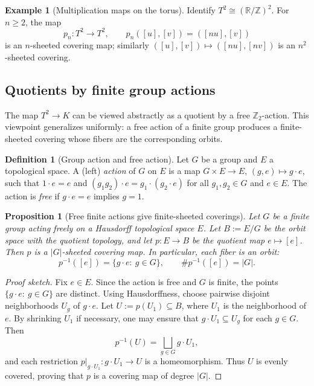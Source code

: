 \documentclass[11pt,a4paper]{article}
\newtheorem{proposition}[theorem]{Proposition}
\theoremstyle{definition}
\newtheorem{definition}[theorem]{Definition}
\newtheorem{example}[theorem]{Example}
\theoremstyle{remark}
\begin{document}
\begin{example}[Multiplication maps on the torus]
\label{ex:nfold-torus}
Identify \(T^2\cong (\mathbb{R}/\mathbb{Z})^2\). For \(n\ge 2\), the map
\[
p_n:T^2\to T^2,\qquad p_n([u],[v])=([nu],[v])
\]
is an \(n\)-sheeted covering map; similarly \(([u],[v])\mapsto([nu],[nv])\) is an \(n^2\)-sheeted covering.
\end{example}

\subsection{Quotients by finite group actions}
\label{sec:appendix-finite-group-quotients}

The map \(T^2\to K\) can be viewed abstractly as a quotient by a free \(\mathbb{Z}_2\)-action. This viewpoint generalizes uniformly: a free action of a finite group produces a finite-sheeted covering whose fibers are the corresponding orbits.

\begin{definition}[Group action and free action]
\label{def:free-action}
Let \(G\) be a group and \(E\) a topological space. A (left) \emph{action} of \(G\) on \(E\) is a map \(G\times E\to E\), \((g,e)\mapsto g\cdot e\), such that \(1\cdot e=e\) and \((g_1g_2)\cdot e=g_1\cdot(g_2\cdot e)\) for all \(g_1,g_2\in G\) and \(e\in E\). The action is \emph{free} if \(g\cdot e=e\) implies \(g=1\).
\end{definition}

\begin{proposition}[Free finite actions give finite-sheeted coverings]
\label{prop:finite-free-quotient-cover}
Let \(G\) be a finite group acting freely on a Hausdorff topological space \(E\). Let \(B:=E/G\) be the orbit space with the quotient topology, and let \(p:E\to B\) be the quotient map \(e\mapsto [e]\). Then \(p\) is a \(|G|\)-sheeted covering map. In particular, each fiber is an orbit:
\[
p^{-1}([e])=\{g\cdot e:\ g\in G\},
\qquad
\#p^{-1}([e])=|G|.
\]
\end{proposition}

\begin{proof}[Proof sketch]
Fix \(e\in E\). Since the action is free and \(G\) is finite, the points \(\{g\cdot e:\ g\in G\}\) are distinct. Using Hausdorffness, choose pairwise disjoint neighborhoods \(U_g\) of \(g\cdot e\). Let \(U:=p(U_1)\subseteq B\), where \(U_1\) is the neighborhood of \(e\). By shrinking \(U_1\) if necessary, one may ensure that \(g\cdot U_1\subseteq U_g\) for each \(g\in G\). Then
\[
p^{-1}(U)=\bigsqcup_{g\in G} g\cdot U_1,
\]
and each restriction \(p|_{g\cdot U_1}:g\cdot U_1\to U\) is a homeomorphism. Thus \(U\) is evenly covered, proving that \(p\) is a covering map of degree \(|G|\).
\end{proof}
\end{document}
